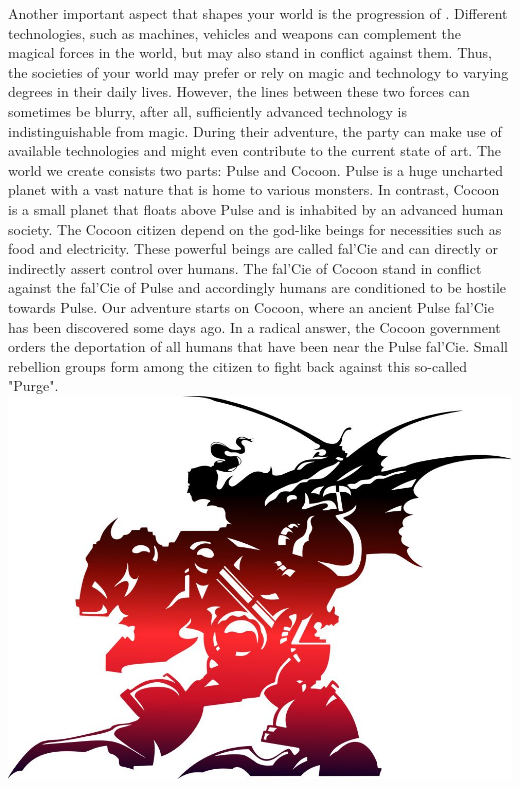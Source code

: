 %
\ofpar
%
Another important aspect that shapes your world is the progression of .
Different technologies, such as machines, vehicles and weapons can complement the magical forces in the world, but may also stand in conflict against them.
Thus, the societies of your world may prefer or rely on magic and technology to varying degrees in their daily lives.
However, the lines between these two forces can sometimes be blurry, after all, sufficiently advanced technology is indistinguishable from magic.
During their adventure, the party can make use of available technologies and might even contribute to the current state of art.
%
\ofpar
%
{
	The world we create consists two parts: Pulse and Cocoon.
	Pulse is a huge uncharted planet with a vast nature that is home to various monsters.
	In contrast, Cocoon is a small planet that floats above Pulse and is inhabited by an advanced human society.
	The Cocoon citizen depend on the god-like beings for necessities such as food and electricity.
	These powerful beings are called fal'Cie and can directly or indirectly assert control over humans.
	The fal'Cie of Cocoon stand in conflict against the fal'Cie of Pulse and accordingly humans are conditioned to be hostile towards Pulse.		
	Our adventure starts on Cocoon, where an ancient Pulse fal'Cie has been discovered some days ago.
	In a radical answer, the Cocoon government orders the deportation of all humans that have been near the Pulse fal'Cie.
	Small rebellion groups form among the citizen to fight back against this so-called "Purge".
}
%
\clearpage
%
%
\vfill
%
\includegraphics[width=\columnwidth]{./art/images/ff6.jpg}
